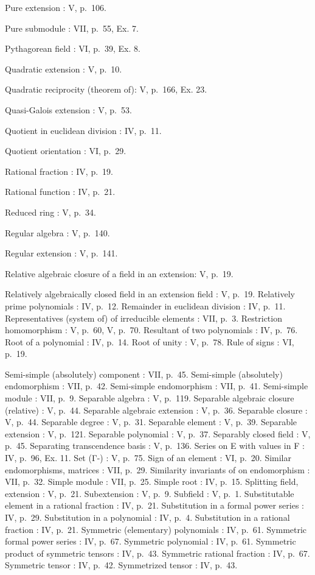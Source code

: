 Pure extension : V, p.~106.

Pure submodule : VII, p.~55, Ex. 7.

Pythagorean field : VI, p.~39, Ex. 8.

Quadratic extension : V, p.~10.

Quadratic reciprocity (theorem of): V, p.~166, Ex. 23.

Quasi-Galois extension : V, p.~53.

Quotient in euclidean division : IV, p.~11.

Quotient orientation : VI, p.~29.

Rational fraction : IV, p.~19.

Rational function : IV, p.~21.

Reduced ring : V, p.~34.

Regular algebra : V, p.~140.

Regular extension : V, p.~141.

Relative algebraic closure of a field in an extension: V, p.~19.

Relatively algebraically closed field in an extension field : V, p.~19. Relatively prime polynomials : IV, p.~12. Remainder in euclidean division : IV, p.~11. Representatives (system of) of irreducible elements : VII, p.~3. Restriction homomorphism : V, p.~60, V, p.~70. Resultant of two polynomials : IV, p.~76. Root of a polynomial : IV, p.~14. Root of unity : V, p.~78. Rule of signs : VI, p.~19.

Semi-simple (absolutely) component : VII, p.~45. Semi-simple (absolutely) endomorphism : VII, p.~42. Semi-simple endomorphism : VII, p.~41. Semi-simple module : VII, p.~9. Separable algebra : V, p.~119. Separable algebraic closure (relative) : V, p.~44. Separable algebraic extension : V, p.~36. Separable closure : V, p.~44. Separable degree : V, p.~31. Separable element : V, p.~39. Separable extension : V, p.~121. Separable polynomial : V, p.~37. Separably closed field : V, p.~45. Separating transcendence basis : V, p.~136. Series on E with values in F : IV, p.~96, Ex. 11. Set (Γ-) : V, p.~75. Sign of an element : VI, p.~20. Similar endomorphisms, matrices : VII, p.~29. Similarity invariants of on endomorphism : VII, p.~32. Simple module : VII, p.~25. Simple root : IV, p.~15. Splitting field, extension : V, p.~21. Subextension : V, p.~9. Subfield : V, p.~1. Substitutable element in a rational fraction : IV, p.~21. Substitution in a formal power series : IV, p.~29. Substitution in a polynomial : IV, p.~4. Substitution in a rational fraction : IV, p.~21. Symmetric (elementary) polynomials : IV, p.~61. Symmetric formal power series : IV, p.~67. Symmetric polynomial : IV, p.~61. Symmetric product of symmetric tensors : IV, p.~43. Symmetric rational fraction : IV, p.~67. Symmetric tensor : IV, p.~42. Symmetrized tensor : IV, p.~43.


